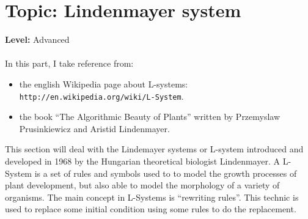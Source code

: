 \chapter{Topic: Lindenmayer system}
{ }\hfill\textbf{Level:} Advanced\\ \\
\noindent
In this part, I take reference from:
\begin{itemize}
 \item  the english Wikipedia page about L-systems: \texttt{http://en.wikipedia.org/wiki/L-System}.
 \item the book ``The Algorithmic Beauty of Plants'' written by Przemyslaw Prusinkiewicz and Aristid Lindenmayer.
\end{itemize}
This section will deal with the Lindemayer systems or L-system introduced and developed in 1968 by the Hungarian theoretical biologist Lindenmayer. A L-System is a set of rules and symbols used to to model the growth processes of plant development, but also able to model the morphology of a variety of organisms. The main concept in L-Systems is ``rewriting rules''. This technic is used to replace some initial condition using some rules to do the replacement.
